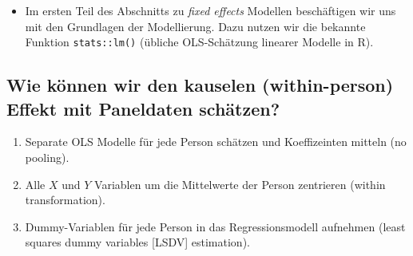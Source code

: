 \documentclass[]{book}
\providecommand{\tightlist}{%
  \setlength{\itemsep}{0pt}\setlength{\parskip}{0pt}}
\begin{document}
\begin{itemize}
\tightlist
\item
  Im ersten Teil des Abschnitts zu \emph{fixed effects} Modellen beschäftigen wir uns mit den Grundlagen der Modellierung. Dazu nutzen wir die bekannte Funktion \texttt{stats::lm()} (übliche OLS-Schätzung linearer Modelle in R).
\end{itemize}

\hypertarget{wie-kuxf6nnen-wir-den-kauselen-within-person-effekt-mit-paneldaten-schuxe4tzen}{%
\subsection*{Wie können wir den kauselen (within-person) Effekt mit Paneldaten schätzen?}\label{wie-kuxf6nnen-wir-den-kauselen-within-person-effekt-mit-paneldaten-schuxe4tzen}}

\begin{enumerate}
\def\labelenumi{\arabic{enumi})}
\tightlist
\item
  Separate OLS Modelle für jede Person schätzen und Koeffizeinten mitteln (no pooling).
\item
  Alle \(X\) und \(Y\) Variablen um die Mittelwerte der Person zentrieren (within transformation).
\item
  Dummy-Variablen für jede Person in das Regressionsmodell aufnehmen (least squares dummy variables {[}LSDV{]} estimation).
\end{enumerate}
\end{document}
